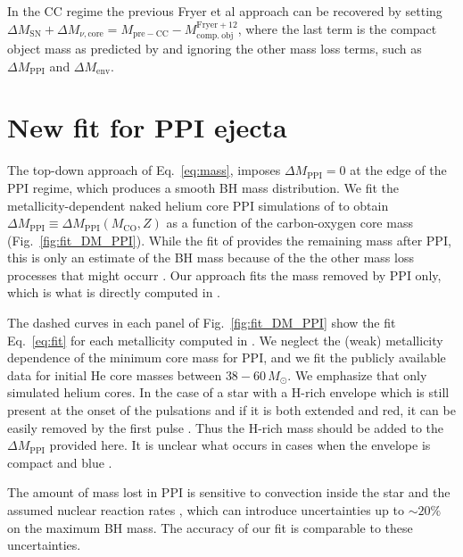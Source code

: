 \documentclass[twocolumn]{aastex63}
\DeclareRobustCommand{\Eqref}[1]{Eq.~\ref{#1}}
\DeclareRobustCommand{\Figref}[1]{Fig.~\ref{#1}}
\begin{document}
In the CC regime the previous Fryer et al approach can be recovered by setting
$\Delta M_\mathrm{SN} + \Delta M_{\nu, \mathrm{core}} = M_\mathrm{pre-CC} - M_\mathrm{comp.\ obj}^\mathrm{Fryer+12}$,
where the last term is the compact object mass as predicted by
\cite{fryer:12} and ignoring the other mass loss terms,
such as $\Delta M_\mathrm{PPI}$ and $\Delta M_\mathrm{env}$.

\section{New fit for PPI ejecta}

The top-down approach of \Eqref{eq:mass}, imposes
$\Delta M_\mathrm{PPI}=0$ at the edge of the PPI regime,
which produces a smooth BH mass
distribution. We fit the metallicity-dependent naked helium core PPI
simulations of \cite{farmer:19} to obtain
$\Delta M_\mathrm{PPI} \equiv \Delta M_\mathrm{PPI}(M_\mathrm{CO},Z)$ as
a function of the carbon-oxygen core mass (\Figref{fig:fit_DM_PPI}). While the fit of
\cite{farmer:19} provides the remaining mass after PPI, this is only
an estimate of the BH mass because of the the other mass loss processes that
might occurr \citep[e.g.,][]{renzo:20csm, powell:21, rahman:22}. Our approach
fits the mass removed by PPI only, which is what is directly computed
in \cite{farmer:19}.


The dashed curves in each panel of \Figref{fig:fit_DM_PPI} show the
fit \Eqref{eq:fit} for each metallicity computed in
\cite{farmer:19}. We neglect the (weak) metallicity dependence of the
minimum core mass for PPI, and we fit the publicly available data for initial He core
masses between $38-60\,M_\odot$.  We emphasize that \cite{farmer:19}
only simulated helium cores. In the case of a star with a H-rich envelope which is still
present at the onset of the pulsations and if it is both extended and red, it can be
easily removed by the first pulse \citep[][]{woosley:17,renzo:20csm}. Thus the H-rich mass should be added to the
$\Delta M_\mathrm{PPI}$ provided here. It is unclear what occurs in
cases when the envelope is compact and blue \cite{dicarlo:19, renzo:20merger, costa:21}.

The amount of mass lost in PPI is sensitive to convection inside the star
\citep{renzo:20conv} and the assumed nuclear reaction rates \citep{farmer:19,
  farmer:20, costa:21, woosley:21, mehta:21}, which can introduce
  uncertainties up to $\sim{}20\%$ on the maximum BH mass. The accuracy
of our fit is comparable to these uncertainties.
\end{document}

